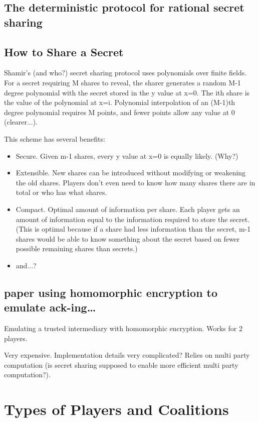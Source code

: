 \documentclass{article}
\begin{document}
\subsection{The deterministic protocol for rational secret sharing}

\subsection{How to Share a Secret}
Shamir's (and who?) secret sharing protocol uses polynomials over finite fields. For a secret requiring M shares to reveal, the sharer generates a random M-1 degree polynomial with the secret stored in the y value at x=0. The ith share is the value of the polynomial at x=i. Polynomial interpolation of an (M-1)th degree polynomial requires M points, and fewer points allow any value at 0 (clearer...).

This scheme has several benefits:
\begin{itemize}
	\item Secure. Given m-1 shares, every y value at x=0 is equally likely. (Why?)
	\item Extensible. New shares can be introduced without modifying or weakening the old shares. Players don't even need to know how many shares there are in total or who has what shares.
	\item Compact. Optimal amount of information per share. Each player gets an amount of information equal to the information required to store the secret. (This is optimal because if a share had less information than the secret, m-1 shares would be able to know something about the secret based on fewer possible remaining shares than secrets.)
	\item and...?
\end{itemize}

\subsection{paper using homomorphic encryption to emulate ack-ing\ldots}
Emulating a trusted intermediary with homomorphic encryption. Works for 2 players.

Very expensive. Implementation details very complicated? Relies on multi party computation (is secret sharing supposed to enable more efficient multi party computation?).

\section{Types of Players and Coalitions}
\end{document}
